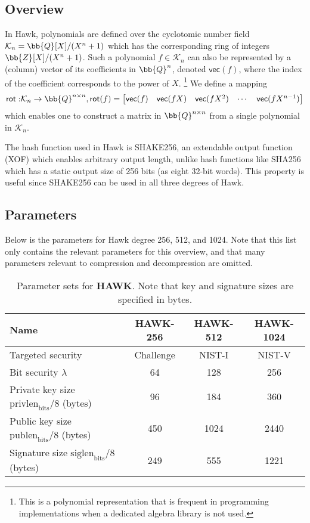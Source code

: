 \subsection{Overview}
In Hawk, polynomials are defined over the cyclotomic number field $\mathcal{K}_n = \bb{Q}[X]/(X^n +1)$ which has the corresponding ring of integers
$\bb{Z}[X] / (X^n + 1)$. Such a polynomial $f \in \mathcal{K}_n$ can also be represented by a (column) vector of its coefficients in $\bb{Q}^n$, denoted $\mathsf{vec}(f)$, where the index of 
the coefficient corresponds to the power of $X$. 
\footnote{This is a polynomial representation that is frequent in programming implementations when a dedicated algebra library is not used.}
We define a mapping 
\[\mathsf{rot:} \mathcal{K}_n \rightarrow \bb{Q}^{n \times n}, \mathsf{rot}(f) = 
\begin{bmatrix} 
    \mathsf{vec}(f) & \mathsf{vec}(fX) & \mathsf{vec}(fX^2) & \cdots & \mathsf{vec}(fX^{n-1})
\end{bmatrix}    
\]
which enables one to construct a matrix in $\bb{Q}^{n \times n}$ from a single polynomial in $\mathcal{K}_n$.

The hash function used in Hawk is SHAKE256, an extendable output function (XOF) which enables arbitrary output length, unlike hash functions like SHA256 which 
has a static output size of 256 bits (as eight 32-bit words). This property is useful since SHAKE256 can be used in all three degrees of Hawk.

\subsection{Parameters}
Below is the parameters for Hawk degree 256, 512, and 1024. Note that this list only contains the relevant parameters for this overview, and that many parameters relevant to 
compression and decompression are omitted.

\begin{table}[h]
    \centering
    \caption{Parameter sets for \textbf{HAWK}. Note that key and signature sizes are specified in bytes.}
    \label{tab:hawk-parameters}
    \begin{tabular}{lccc}
        \toprule
        \textbf{Name} & \textbf{HAWK-256} & \textbf{HAWK-512} & \textbf{HAWK-1024} \\
        \midrule
        \multicolumn{1}{l}{Targeted security} & Challenge & NIST-I & NIST-V \\
        Bit security $\lambda$ & 64 & 128 & 256 \\
        \midrule
        Private key size $\text{privlen}_{\text{bits}}/8$ (bytes) & 96 & 184 & 360 \\
        Public key size $\text{publen}_{\text{bits}}/8$ (bytes) & 450 & 1024 & 2440 \\
        Signature size $\text{siglen}_{\text{bits}}/8$ (bytes) & 249 & 555 & 1221 \\
        \bottomrule
    \end{tabular}
\end{table}

